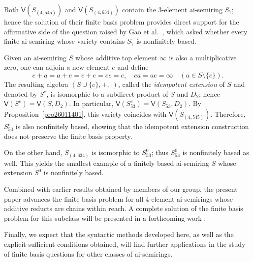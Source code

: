 \documentclass[reqno]{amsart}
\theoremstyle{plain}
\theoremstyle{definition}
\begin{document}
Both $\mathsf{V}(S_{(4, 545)})$ and $\mathsf{V}(S_{(4, 634)})$ contain the $3$-element ai-semiring $S_7$;
hence the solution of their finite basis problem provides direct support
for the affirmative side of the question raised by Gao et al.~\cite{gjrz2},
which asked whether every finite ai-semiring whose variety contains $S_7$ is nonfinitely based.

Given an ai-semiring $S$ whose additive top element $\infty$ is also a multiplicative zero,
one can adjoin a new element $e$ and define
\[
e+a = a+e = e+e = ee = e, \quad ea = ae = \infty \quad (a \in S \setminus\{e\}).
\]
The resulting algebra $(S \cup\{e\},+,\cdot)$, called the \emph{idempotent extension} of $S$ and denoted by $S^e$,
is isomorphic to a subdirect product of $S$ and $D_2$;
hence $\mathsf{V}(S^e)=\mathsf{V}(S,D_2)$.
In particular, $\mathsf{V}(S_{53}^e)=\mathsf{V}(S_{53},D_2)$.
By Proposition~\ref{pro26011401}, this variety coincides with
$\mathsf{V}(S_{(4,545)})$. Therefore, $S_{53}^e$ is also nonfinitely based,
showing that the idempotent extension construction does not preserve the finite basis property.

On the other hand, $S_{(4, 634)}$ is isomorphic to $S_{53}^0$; thus $S_{53}^0$ is nonfinitely based as well.
This yields the smallest example of a finitely based ai-semiring $S$
whose extension $S^0$ is nonfinitely based.

Combined with earlier results obtained by members of our group,
the present paper advances the finite basis problem for all $4$-element ai-semirings
whose additive reducts are chains within reach.
A complete solution of the finite basis problem for this subclass will be presented in a forthcoming work \cite{ryy}.

Finally, we expect that the syntactic methods developed here, as well as the explicit sufficient conditions obtained,
will find further applications in the study of finite basis questions for other classes of ai-semirings.
\end{document}
